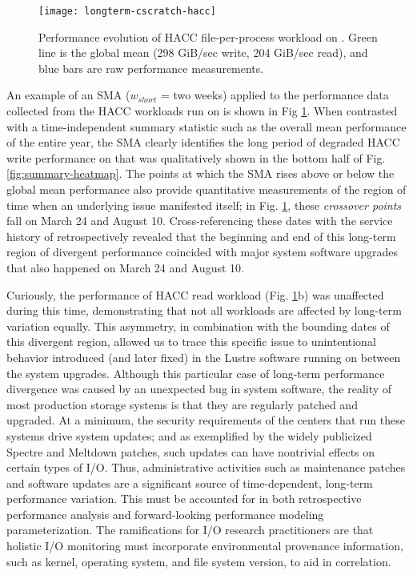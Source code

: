 \begin{figure}
    \centering
    \texttt{[image: longterm-cscratch-hacc]}
    \vspace{-.35in}
    \caption{Performance evolution of HACC file-per-process workload on \cori.  Green line is the global mean (298 GiB/sec write, 204 GiB/sec read), and blue bars are raw performance measurements.}
    \label{fig:timeseries-baseline}
\end{figure}


An example of an SMA ($w_{short}$ = two weeks) applied to the performance data collected from the HACC workloads run on \cori is shown in Fig \ref{fig:timeseries-baseline}.
When contrasted with a time-independent summary statistic such as the overall mean performance of the entire year, the SMA clearly identifies the long period of degraded HACC write performance on \cori that was qualitatively shown in the bottom half of Fig. \ref{fig:summary-heatmap}.
The points at which the SMA rises above or below the global mean performance also provide quantitative measurements of the region of time when an underlying issue manifested itself;
in Fig. \ref{fig:timeseries-baseline}, these \emph{crossover points} fall on March 24 and August 10.
Cross-referencing these dates with the service history of \cori retrospectively revealed that the beginning and end of this long-term region of divergent performance coincided with major system software upgrades that also happened on March 24 and August 10.

Curiously, the performance of HACC read workload (Fig. \ref{fig:timeseries-baseline}b) was unaffected during this time, demonstrating that not all workloads are affected by long-term variation equally.
This asymmetry, in combination with the bounding dates of this divergent region, allowed us to trace this specific issue to unintentional behavior introduced (and later fixed) in the Lustre software running on \cori between the system upgrades.
Although this particular case of long-term performance divergence was caused by an unexpected bug in system software, the reality of most production storage systems is that they are regularly patched and upgraded.
At a minimum, the security requirements of the centers that run these systems drive system updates; and as exemplified by the widely publicized Spectre and Meltdown patches, such updates can have nontrivial effects on certain types of I/O.
Thus, administrative activities such as maintenance patches and software updates are a significant source of time-dependent, long-term performance variation.
This must be accounted for in both retrospective performance analysis and forward-looking performance modeling parameterization.  
The ramifications for I/O research practitioners are that holistic I/O monitoring must incorporate environmental provenance information, such as kernel, operating system, and file system version, to aid in correlation.

